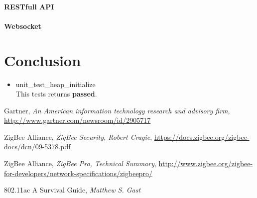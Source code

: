 \documentclass[a4paper,12pt,english]{article}
\begin{document}
\paragraph{RESTfull API}
\paragraph{Websocket}

\section{Conclusion}

\begin{itemize}
  \item{unit\_test\_heap\_initialize}
    \\
    This tests returns \textbf{passed}.
\end{itemize}

\clearpage
\begin{thebibliography}{9}


  Gartner,
  \emph{ An American information technology research and advisory
  firm}, \url{http://www.gartner.com/newsroom/id/2905717}

ZigBee Alliance,
\emph{ZigBee Security, Robert Cragie},
\url{https://docs.zigbee.org/zigbee-docs/dcn/09-5378.pdf}

ZigBee Alliance,
\emph{ZigBee Pro, Technical Summary},
\url{http://www.zigbee.org/zigbee-for-developers/network-specifications/zigbeepro/}

802.11ac A Survival Guide,
\emph{Matthew S. Gast}

\end{thebibliography}
\end{document}
